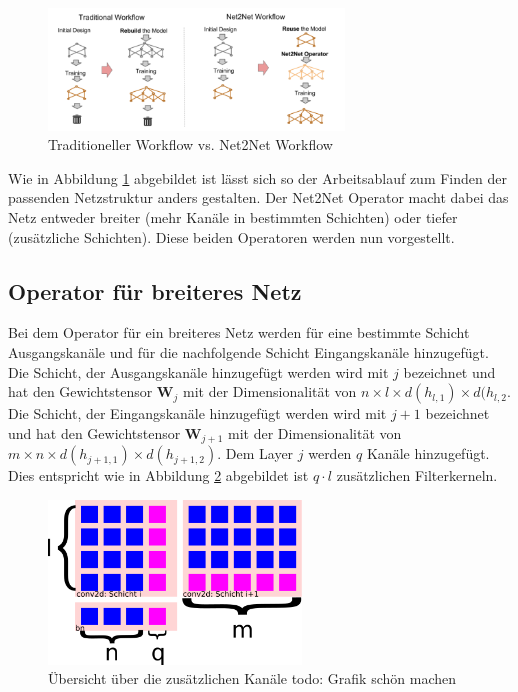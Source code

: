 \begin{figure}[h]
 \centering
 \includegraphics[width=0.7\textwidth]{KapitelPartA/images/net2net.png}
 \caption{Traditioneller Workflow vs. Net2Net Workflow}
 \label{abb:net2net}
\end{figure}


Wie in Abbildung \ref{abb:net2net} abgebildet ist lässt sich so der Arbeitsablauf zum Finden der passenden Netzstruktur anders gestalten. Der Net2Net Operator macht dabei das Netz entweder breiter (mehr Kanäle in bestimmten Schichten) oder tiefer (zusätzliche Schichten). Diese beiden Operatoren werden nun vorgestellt.

\subsection{Operator für breiteres Netz}
Bei dem Operator für ein breiteres Netz werden für eine bestimmte Schicht Ausgangskanäle und für die nachfolgende Schicht Eingangskanäle hinzugefügt. Die Schicht, der Ausgangskanäle hinzugefügt werden wird mit $j$ bezeichnet und hat den Gewichtstensor $\mathbf{W}_j$ mit der Dimensionalität von $n \times l \times d(h_{l,1}) \times d(h_{l,2}$. Die Schicht, der Eingangskanäle hinzugefügt werden wird mit $j+1$ bezeichnet und hat den Gewichtstensor $\mathbf{W}_{j+1}$ mit der Dimensionalität von $m \times n \times d(h_{j+1,1}) \times d(h_{j+1,2})$. Dem Layer $j$ werden $q$ Kanäle hinzugefügt. Dies entspricht wie in Abbildung \ref{abb:channels} abgebildet ist $q \cdot l $ zusätzlichen Filterkerneln. 
\begin{figure}[h]
 \centering
 \includegraphics[width=0.6\textwidth]{KapitelPartA/images/channels.png}
 \caption{Übersicht über die zusätzlichen Kanäle todo: Grafik schön machen}
\label{abb:channels}
 \end{figure}



